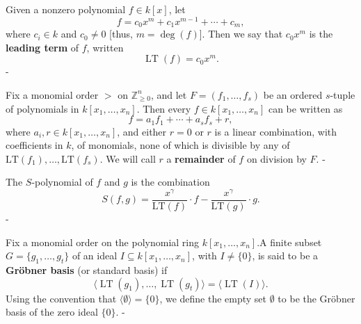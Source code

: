 \begin{definition}\label{leadingTerm}
  \leanok

  Given a nonzero polynomial \( f \in k[x] \), let
\[
f = c_0 x^m + c_1 x^{m-1} + \cdots + c_m,
\]
where \( c_i \in k \) and \( c_0 \neq 0 \) [thus, \( m = \deg(f) \)]. Then we say that \( c_0 x^m \) is the \textbf{leading term} of \( f \), written
\[
\operatorname{LT}(f) = c_0 x^m.
\]
-
\end{definition}

\begin{definition}\label{IsRemainder}
  \leanok

  Fix a monomial order \(>\) on \(\mathbb{Z}_{\geq 0}^n\), and let
\(F = (f_1, \ldots, f_s)\) be an ordered \(s\)-tuple of polynomials in \(k[x_1, \ldots, x_n]\).
Then every \(f \in k[x_1, \ldots, x_n]\) can be written as
\[
f = a_1 f_1 + \cdots + a_s f_s + r,
\]
where \(a_i, r \in k[x_1, \ldots, x_n]\), and either \(r = 0\) or \(r\) is a linear combination, with coefficients in \(k\), of monomials, none of which is divisible by any of \(\mathrm{LT}(f_1), \ldots, \mathrm{LT}(f_s)\).
We will call \(r\) a \textbf{remainder} of \(f\) on division by \(F\).
-
\end{definition}

\begin{definition}\label{leading_term_ideal}
  \leanok

\end{definition}

\begin{definition}\label{sPolynomial}
  \leanok

  The $S$-polynomial of $f$ and $g$ is the combination
\[
S(f, g) = \frac{x^\gamma}{\mathrm{LT}(f)} \cdot f - \frac{x^\gamma}{\mathrm{LT}(g)} \cdot g.
\]
-
\end{definition}

\begin{definition}\label{IsGroebnerBasis}
  \leanok
  Fix a monomial order on the polynomial ring $k[x_1, \ldots, x_n]$.A finite subset $G = \{g_1, \ldots, g_t\}$ of an ideal $I \subseteq k[x_1, \ldots, x_n]$, with $I \ne \{0\}$, is said to be a \textbf{Gröbner basis} (or standard basis) if
\[
\langle \operatorname{LT}(g_1), \ldots, \operatorname{LT}(g_t) \rangle = \langle \operatorname{LT}(I) \rangle.
\]
Using the convention that $\langle \emptyset \rangle = \{0\}$, we define the empty set $\emptyset$ to be the Gröbner basis of the zero ideal $\{0\}$.
-
\end{definition}

